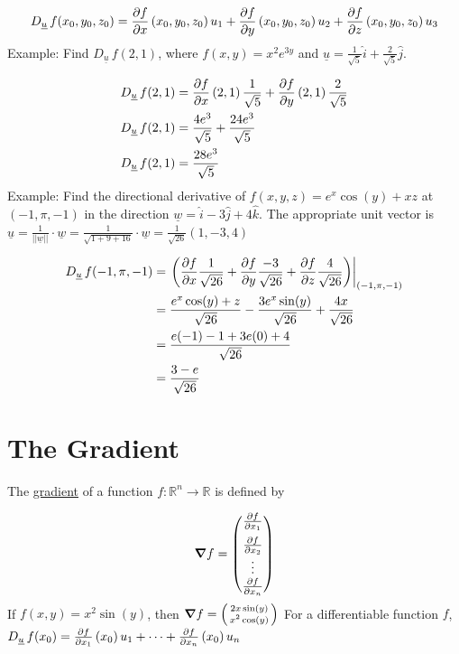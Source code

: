 \documentclass{article}
\newcommand{\n}{\leavevmode \newline} %
\newcommand{\nn}{\leavevmode \newline \newline} %
\newcommand{\R}{\mathbb{R}} %
\newcommand{\Du}{D_{\underline{u}}\,} %
\numberwithin{equation}{subsection} %
\begin{document}
\begin{equation}
    \Du f(x_0,y_0,z_0) = \pdv{f}{x}\left(x_0,y_0,z_0\right)u_1 + \pdv{f}{y}\left(x_0,y_0,z_0\right)u_2 + \pdv{f}{z}\left(x_0,y_0,z_0\right)u_3
\end{equation}
\n
Example:
Find $\Du f(2,1)$, where $f(x,y)=x^2e^{3y}$ and $\underline{u}=\frac{1}{\sqrt{5}}\hat{i}+\frac{2}{\sqrt{5}}\hat{j}$.

\begin{equation}
    \begin{split}
        \Du f(2,1) &= \pdv{f}{x}\left(2,1\right) \frac{1}{\sqrt{5}} + \pdv{f}{y}\left(2,1\right) \frac{2}{\sqrt{5}}\\
        \Du f(2,1) &= \frac{4e^3}{\sqrt{5}}+\frac{24e^3}{\sqrt{5}}\\
        \Du f(2,1) &= \frac{28e^3}{\sqrt{5}}
    \end{split}
\end{equation}
\n
Example: Find the directional derivative of $f(x,y,z)=e^x\cos(y)+xz$ at $(-1,\pi,-1)$ in the direction $\underline{w}= \hat{i} -3\hat{j}+4\hat{k}$.
\nn
The appropriate unit vector is $\underline{u}= \frac{1}{||\underline{w}||}\cdot\underline{w}=\frac{1}{\sqrt{1+9+16}}\cdot \underline{w}=\frac{1}{\sqrt{26}}(1,-3,4)$

\begin{equation}
    \begin{split}
        \Du f(-1,\pi,-1) &= \left. \left( \pdv{f}{x}\frac{1}{\sqrt{26}} + \pdv{f}{y}\frac{-3}{\sqrt{26}}+\pdv{f}{z}\frac{4}{\sqrt{26}}\right) \right|_{(-1,\pi,-1)}\\
        &= \frac{e^x\cos(y)+z}{\sqrt{26}}- \frac{3e^x\sin(y)}{\sqrt{26}}+\frac{4x}{\sqrt{26}} \\
        &= \frac{e(-1)-1+3e(0)+4}{\sqrt{26}}\\
        &= \frac{3-e}{\sqrt{26}}
    \end{split}
\end{equation}
\section{The Gradient}
The \underline{gradient} of a function $f:\R^n\to\R$ is defined by

\begin{equation}
    \grad f = 
    \begin{pmatrix}
        \pdv{f}{x_1} \vspace{0.5em}\\
        \pdv{f}{x_2}\\
        \vdots\\
        \pdv{f}{x_n}
    \end{pmatrix}
\end{equation}
\n
If $f(x,y)=x^2\sin(y)$, then $\grad f = \begin{psmallmatrix} 2x\sin(y)\\x^2\cos(y) \end{psmallmatrix}$
\nn
For a differentiable function $f$, $\Du f(x_0)=\pdv{f}{x_1}\left(x_0\right)u_1+\cdots+\pdv{f}{x_n}\left(x_0\right)u_n$
\end{document}
